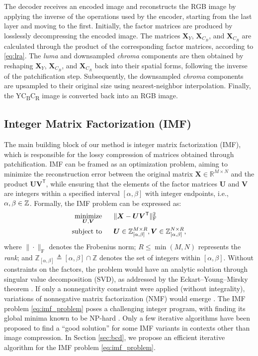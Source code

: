 The decoder receives an encoded image and reconstructs the RGB image by applying the inverse of the operations used by the encoder, starting from the last layer and moving to the first. Initially, the factor matrices are produced by losslessly decompressing the encoded image. The matrices $\bm{X}_{Y}$, $\bm{X}_{C_B}$, and $\bm{X}_{C_R}$ are calculated through the product of the corresponding factor matrices, according to \eqref{eq:lra}. The \emph{luma} and downsampled \emph{chroma} components are then obtained by reshaping $\bm{X}_{Y}$, $\bm{X}_{C_B}$, and $\bm{X}_{C_R}$ back into their spatial forms, following the inverse of the patchification step. Subsequently, the downsampled \emph{chroma} components are upsampled to their original size using nearest-neighbor interpolation. Finally, the YC\textsubscript{B}C\textsubscript{R} image is converted back into an RGB image.


\subsection{Integer Matrix Factorization (IMF)} \label{sec:imf}

The main building block of our method is integer matrix factorization (IMF), which is responsible for the lossy compression of matrices obtained through patchification. IMF can be framed as an optimization problem, aiming to minimize the reconstruction error between the original matrix $\bm{X} \in \mathbb{R}^{M \times N}$ and the product $\bm{U} \bm{V}^\mathsf{T}$, while ensuring that the elements of the factor matrices $\bm{U}$ and $\bm{V}$ are integers within a specified interval $[\alpha,\beta]$ with integer endpoints, i.e., $\alpha,\beta \in \mathbb{Z}$. Formally, the IMF problem can be expressed as:
\begin{align} \label{eq:imf_problem}
    \operatorname*{minimize}_{\bm{U}, \bm{V}}  \quad & \ \  \| \bm{X} - \bm{U} \bm{V}^\mathsf{T} \|_\text{F}^2 \nonumber                                             \\
    \text{subject to} \quad                 & \ \ \bm{U} \in \mathbb{Z}_{[\alpha,\beta]}^{M \times R}, \bm{V} \in \mathbb{Z}_{[\alpha,\beta]}^{N \times R},
\end{align}
where $\|\cdot\|_\text{F}$ denotes the Frobenius norm; $R \leq \min(M,N)$ represents the \emph{rank}; and $\mathbb{Z}_{[\alpha,\beta]} \triangleq [\alpha,\beta] \cap \mathbb{Z}$ denotes the set of integers within $[\alpha,\beta]$. Without constraints on the factors, the problem would have an analytic solution through singular value decomposition (SVD), as addressed by the Eckart–Young–Mirsky theorem \cite{eckart1936approximation}. If only a nonnegativity constraint were applied (without integrality), variations of nonnegative matrix factorization (NMF) would emerge \cite{lee2000algorithms, gillis2020nonnegative}. The IMF problem \eqref{eq:imf_problem} poses a challenging integer program, with finding its global minima known to be NP-hard \cite{dong2018integer, van1981another}. Only a few iterative algorithms \cite{dong2018integer, lin2005integer} have been proposed to find a ``good solution'' for some IMF variants in contexts other than image compression. In Section \ref{sec:bcd}, we propose an efficient iterative algorithm for the IMF problem \eqref{eq:imf_problem}.

